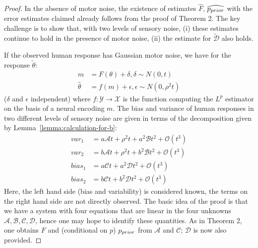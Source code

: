 \begin{proof}
In the absence of motor noise, the existence of estimates $\widehat{F}$, $\widehat{p_{prior}}$ with the error estimates claimed already follows from the proof of Theorem 2. 
    The key challenge is to show that, with two levels of sensory noise, (i) these estimates continue to hold in the presence of motor noise, (ii) the estimate for $\tilde{\mathcal{D}}$ also holds.
    
    If the observed human response has Gaussian motor noise, we have for the response $\tilde{\theta}$:
    \begin{align*}
        m &= F(\theta) + \delta, \delta \sim N(0, t)\\
        \widehat{\theta} &= f(m) + \epsilon, \epsilon \sim N(0, \rho^2 t)
    \end{align*}
    ($\delta$ and $\epsilon$ independent) where $f : \mathcal{Y} \rightarrow \mathcal{X}$ is the function computing the $L^p$ estimator on the basis of a neural encoding $m$.
    The bias and variance of human responses in two different levels of sensory noise are given in terms of the decomposition given by Lemma~\ref{lemma:calculation-for-b}:
    \begin{equation}\label{eq:four-expansions}
    \begin{aligned}
        var_1 &= a\mathcal{A}t + \rho^2t + a^2\mathcal{B}t^2 + \mathcal{O}(t^3)\\
        var_2 &= b\mathcal{A}t + \rho^2t + b^2\mathcal{B}t^2 + \mathcal{O}(t^3)\\
        bias_1 &= a\mathcal{C}t + a^2\mathcal{D}t^2 + \mathcal{O}(t^3)\\
        bias_2 &= b\mathcal{C}t + b^2\mathcal{D}t^2 + \mathcal{O}(t^3)
    \end{aligned}
    \end{equation}
    Here, the left hand side (bias and variability) is considered known, the terms on the right hand side are not directly observed.
    The basic idea of the proof is that we have a system with four equations that are linear in the four unknowns $\mathcal{A}, \mathcal{B}, \mathcal{C}, \mathcal{D}$, hence one may hope to identify these quantities. As in Theorem 2, one obtains $F$ and (conditional on $p$) $p_{prior}$ from $\mathcal{A}$ and $\mathcal{C}$; $\mathcal{D}$ is now also provided.



\end{proof}
